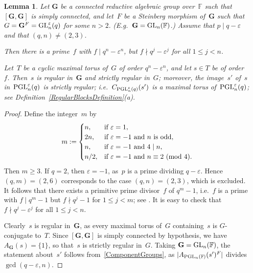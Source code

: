 \documentclass[12pt]{amsart}
\newcommand{\bG}{{\mathbf{G}}}      %
\def\GL{ \text{\rm GL} }
\def\PGL{ \text{\rm PGL} }
\newtheorem{lem}[thm]{Lemma}
\theoremstyle{theorem}
\theoremstyle{definition}
\theoremstyle{remark}
\begin{document}
\begin{lem}
\label{ElementsInGeneralPosition}
Let $\bG$ be a connected reductive algebraic group over~$\mathbb{F}$ such that
$[\bG,\bG]$ is simply connected, and let~$F$ be a Steinberg morphism of~$\bG$ 
such that $G = \bG^F = \GL_n^{\varepsilon}( q )$ for some $n > 2$. (E.g.\ 
$\bG = \GL_n( \mathbb{F} )$.)
Assume that $p \mid q - \varepsilon$ and that $(q,n) \neq (2,3)$.

Then there is a prime~$f$ with $f \mid q^n - \varepsilon^n$, but
$f \nmid q^j - \varepsilon^j$ for all $1 \leq j < n$.

Let~$T$ be a cyclic maximal torus of~$G$ of order $q^n - \varepsilon^n$, and let 
$s \in T$ be of order~$f$. Then~$s$ is regular in~$\bG$ and strictly regular 
in~$G$; moreover, the image~$s'$ of~$s$ 
in~$\PGL_n^{\varepsilon}(q)$ is strictly regular; i.e.\ 
$C_{\PGL_n^{\varepsilon}(q)}( s' )$ is a maximal torus 
of~$\PGL_n^{\varepsilon}(q)$; see 
{\rm Definition~\ref{RegularBlocksDefinition}(a)}.
\end{lem}
\begin{proof}
Define the integer~$m$ by
$$m := 
\begin{cases}
n, & \text{if\ } \varepsilon = 1, \\
2n, & \text{if\ } \varepsilon = -1 \text{\ and\ } n \text{\ is odd}, \\
n, & \text{if\ } \varepsilon = -1 \text{\ and\ } 4 \mid n, \\
n/2, & \text{if\ } \varepsilon = -1 \text{\ and\ } n \equiv 2\,\,(\mbox{\rm mod}\,\,4). 
\end{cases}
$$
Then $m \geq 3$. If $q = 2$, then $\varepsilon = -1$, as~$p$ is a prime dividing
$q - \varepsilon$. Hence $(q,m) = (2,6)$ corresponds to the case
$(q,n) = (2,3)$, which is excluded. It follows that there exists a
primitive prime divisor~$f$ of $q^m - 1$, i.e.~$f$ is a prime with
$f \mid q^{m} - 1$ but $f \nmid q^j - 1$ for $1 \leq j < m$;
see \cite[Theorem~IX.$8.3$]{HuBl82}.
It is easy to check that $f \nmid q^j - \varepsilon^j$ for all $1 \leq j < n$.

Clearly~$s$ is regular in~$\bG$, as every maximal torus of~$G$ containing~$s$ is 
$G$-conjugate to~$T$. Since $[\bG,\bG]$ is simply connected by hypothesis, we
have $A_{\bG}(s) = \{ 1 \}$, so that~$s$ is strictly regular in~$G$. Taking
$\bG = \GL_n( \mathbb{F} )$, the statement about~$s'$ follows 
from~\ref{ComponentGroups}, as $|A_{\PGL_n( \mathbb{F} )}( s' )^F|$ divides 
$\gcd( q - \varepsilon, n )$. 
\end{proof}
\end{document}
